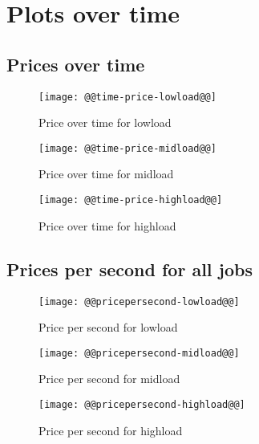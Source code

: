 \documentclass[11pt]{article}
\begin{document}
\newpage
\section{Plots over time}
\subsection{Prices over time}
\begin{figure}[htbp]
  \begin{center}
    \texttt{[image: @@time-price-lowload@@]}
    \caption{Price over time for lowload}
    \label{fig:time-price-lowload}
  \end{center}
\end{figure}
\begin{figure}[htbp]
  \begin{center}
    \texttt{[image: @@time-price-midload@@]}
    \caption{Price over time for midload}
    \label{fig:time-price-midload}
  \end{center}
\end{figure}
\begin{figure}[htbp]
  \begin{center}
    \texttt{[image: @@time-price-highload@@]}
    \caption{Price over time for highload}
    \label{fig:time-price-highload}
  \end{center}
\end{figure}

\newpage
\subsection{Prices per second for all jobs}
\begin{figure}[htbp]
  \begin{center}
    \texttt{[image: @@pricepersecond-lowload@@]}
    \caption{Price per second for lowload}
    \label{fig:pricepersecond-lowload}
  \end{center}
\end{figure}
\begin{figure}[htbp]
  \begin{center}
    \texttt{[image: @@pricepersecond-midload@@]}
    \caption{Price per second for midload}
    \label{fig:pricepersecond-midload}
  \end{center}
\end{figure}
\begin{figure}[htbp]
  \begin{center}
    \texttt{[image: @@pricepersecond-highload@@]}
    \caption{Price per second for highload}
    \label{fig:pricepersecond-highload}
  \end{center}
\end{figure}
\end{document}
